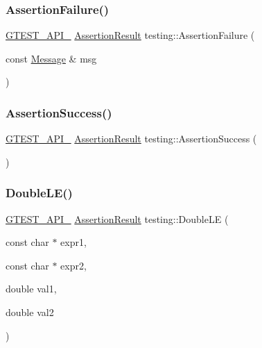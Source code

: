 \mbox{\label{namespacetesting_aed37b5c1db949665e4022cb4740d86c2}} 
\subsubsection{\texorpdfstring{AssertionFailure()}{AssertionFailure()}\hspace{0.1cm}{\footnotesize\ttfamily [2/2]}}
{\footnotesize\ttfamily \mbox{\hyperlink{gtest-port_8h_aa73be6f0ba4a7456180a94904ce17790}{G\+T\+E\+S\+T\+\_\+\+A\+P\+I\+\_\+}} \mbox{\hyperlink{classtesting_1_1_assertion_result}{Assertion\+Result}} testing\+::\+Assertion\+Failure (\begin{DoxyParamCaption}\item[{const \mbox{\hyperlink{classtesting_1_1_message}{Message}} \&}]{msg }\end{DoxyParamCaption})}

\mbox{\label{namespacetesting_a74a3d26c1286bd4d7c189c5dff2483ab}} 
\subsubsection{\texorpdfstring{AssertionSuccess()}{AssertionSuccess()}}
{\footnotesize\ttfamily \mbox{\hyperlink{gtest-port_8h_aa73be6f0ba4a7456180a94904ce17790}{G\+T\+E\+S\+T\+\_\+\+A\+P\+I\+\_\+}} \mbox{\hyperlink{classtesting_1_1_assertion_result}{Assertion\+Result}} testing\+::\+Assertion\+Success (\begin{DoxyParamCaption}{ }\end{DoxyParamCaption})}

\mbox{\label{namespacetesting_a84c020b981d0eb4eabfb0feda155aaaf}} 
\subsubsection{\texorpdfstring{DoubleLE()}{DoubleLE()}}
{\footnotesize\ttfamily \mbox{\hyperlink{gtest-port_8h_aa73be6f0ba4a7456180a94904ce17790}{G\+T\+E\+S\+T\+\_\+\+A\+P\+I\+\_\+}} \mbox{\hyperlink{classtesting_1_1_assertion_result}{Assertion\+Result}} testing\+::\+Double\+LE (\begin{DoxyParamCaption}\item[{const char $\ast$}]{expr1,  }\item[{const char $\ast$}]{expr2,  }\item[{double}]{val1,  }\item[{double}]{val2 }\end{DoxyParamCaption})}

